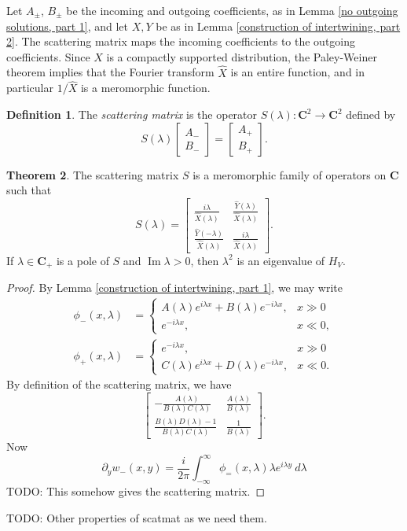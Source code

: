 \documentclass[12pt]{report}
\newcommand{\CC}{\mathbf{C}}
\newcommand{\dfn}[1]{\emph{#1}\index{#1}}
\renewcommand{\Im}{\operatorname{Im}}
\theoremstyle{definition}
\newtheorem{theorem}{Theorem}[chapter]
\newtheorem{definition}[theorem]{Definition}
\begin{document}
Let $A_\pm$, $B_\pm$ be the incoming and outgoing coefficients, as in Lemma \ref{no outgoing solutions, part 1}, and let $X, Y$ be as in Lemma \ref{construction of intertwining, part 2}. The scattering matrix maps the incoming coefficients to the outgoing coefficients. Since $X$ is a compactly supported distribution, the Paley-Weiner theorem implies that the Fourier transform $\hat X$ is an entire function, and in particular $1/\hat X$ is a meromorphic function.
\begin{definition}
The \dfn{scattering matrix} is the operator $S(\lambda): \CC^2 \to \CC^2$ defined by
$$S(\lambda)\begin{bmatrix}A_-\\B_-\end{bmatrix} = \begin{bmatrix}A_+\\B_+\end{bmatrix}.$$
\end{definition}
\begin{theorem}
  The scattering matrix $S$ is a meromorphic family of operators on $\CC$ such that
  $$S(\lambda) = \begin{bmatrix}\frac{i\lambda}{\hat X(\lambda)} & \frac{\hat Y(\lambda)}{\hat X(\lambda)}\\ \frac{\hat Y(-\lambda)}{\hat X(\lambda)} & \frac{i\lambda}{\hat X(\lambda)}\end{bmatrix}.$$
  If $\lambda \in \CC_+$ is a pole of $S$ and $\Im \lambda > 0$, then $\lambda^2$ is an eigenvalue of $H_V$.
\end{theorem}
\begin{proof}
  By Lemma \ref{construction of intertwining, part 1}, we may write
\begin{align*}
  \phi_-(x, \lambda) &= \begin{cases}
  A(\lambda)e^{i\lambda x} + B(\lambda)e^{-i\lambda x}, &x \gg 0\\
  e^{-i\lambda x}, &x \ll 0,
\end{cases}\\
  \phi_+(x, \lambda) &= \begin{cases}
  e^{-i\lambda x}, &x \gg 0\\
  C(\lambda) e^{i\lambda x} + D(\lambda)e^{-i\lambda x}, &x \ll 0.
\end{cases}
\end{align*}
  By definition of the scattering matrix, we have
  $$\begin{bmatrix}
  -\frac{A(\lambda)}{B(\lambda)C(\lambda)} &\frac{A(\lambda)}{B(\lambda)}\\
  \frac{B(\lambda)D(\lambda) - 1}{B(\lambda)C(\lambda)} & \frac{1}{B(\lambda)}
  \end{bmatrix}.$$
  Now
  $$\partial_yw_-(x, y) = \frac{i}{2\pi} \int_{-\infty}^\infty \phi_=(x, \lambda) \lambda e^{i\lambda y} ~d\lambda$$
  TODO: This somehow gives the scattering matrix.
\end{proof}
  TODO: Other properties of scatmat as we need them.
\end{document}
